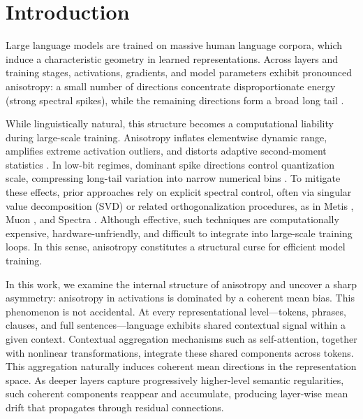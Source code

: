 \section{Introduction}

Large language models are trained on massive human language corpora, which induce a characteristic geometry in learned representations. Across layers and training stages, activations, gradients, and model parameters exhibit pronounced anisotropy: a small number of directions concentrate disproportionate energy (strong spectral spikes), while the remaining directions form a broad long tail \citep{ethayarajh2019contextual, mu2018all, timkey2021rogue, kovaleva2021bertbusters, machina2024anisotropy}.

While linguistically natural, this structure becomes a computational liability during large-scale training. 
Anisotropy inflates elementwise dynamic range, amplifies extreme activation outliers, and distorts adaptive second-moment statistics 
\citep{kingma2014adam, loshchilov2017adamw, spectra2026}. 
In low-bit regimes, dominant spike directions control quantization scale, compressing long-tail variation into narrow numerical bins 
\citep{xiao2023smoothquant, frantar2022gptq, lin2024awq, li2024svdquant, ashkboos2024quarot}. 
To mitigate these effects, prior approaches rely on explicit spectral control, often via singular value decomposition (SVD) or related orthogonalization procedures, as in Metis 
\citep{cao2025metis}, Muon \citep{jordan2024muon}, and Spectra \citep{spectra2026}. 
Although effective, such techniques are computationally expensive, hardware-unfriendly, and difficult to integrate into large-scale training loops. 
In this sense, anisotropy constitutes a structural curse for efficient model training.

In this work, we examine the internal structure of anisotropy and uncover a sharp asymmetry: anisotropy in activations is dominated by a coherent mean bias. This phenomenon is not accidental. At every representational level---tokens, phrases, clauses, and full sentences---language exhibits shared contextual signal within a given context. Contextual aggregation mechanisms such as self-attention, together with nonlinear transformations, integrate these shared components across tokens. This aggregation naturally induces coherent mean directions in the representation space. As deeper layers capture progressively higher-level semantic regularities, such coherent components reappear and accumulate, producing layer-wise mean drift that propagates through residual connections.

